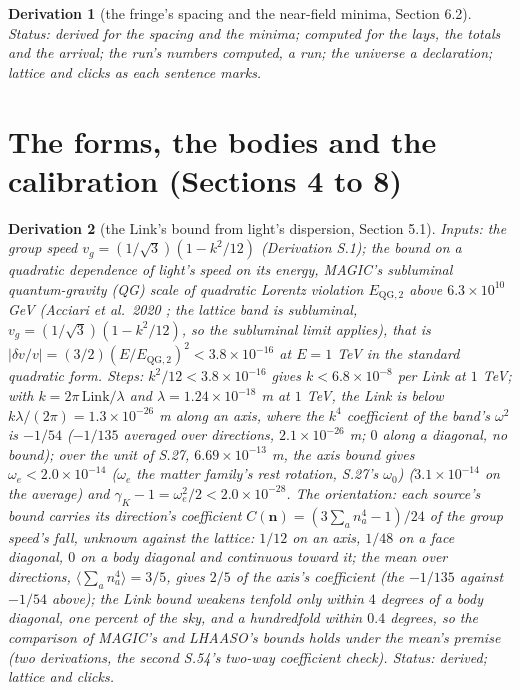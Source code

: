 \documentclass[pdflatex,sn-mathphys-num]{sn-jnl}
\theoremstyle{thmstyleone}
\newtheorem{derivation}{Derivation}
\begin{document}
\begin{derivation}[the fringe's spacing and the near-field minima, Section 6.2]
 \emph{Status:} derived for the spacing and the minima; computed for the lays, the totals and the arrival; the run's numbers computed, a run; the universe a declaration; lattice and clicks as each sentence marks.
\end{derivation}

\section*{The forms, the bodies and the calibration (Sections 4 to 8)}

\begin{derivation}[the Link's bound from light's dispersion, Section 5.1]
\emph{Inputs:} the group speed $v_g = (1 / \sqrt 3)(1 - k^2 / 12)$ (Derivation S.1); the bound on a quadratic dependence of light's speed on its energy, MAGIC's subluminal quantum-gravity (QG) scale of quadratic Lorentz violation $E_{\mathrm{QG}, 2}$ above $6.3 \times 10^{10}$ GeV (Acciari et al.\ 2020 \cite{magic}; the lattice band is subluminal, $v_g = (1 / \sqrt 3)(1 - k^2 / 12)$, so the subluminal limit applies), that is $|\delta v / v| = (3 / 2)(E / E_{\mathrm{QG}, 2})^2 < 3.8 \times 10^{-16}$ at $E = 1$ TeV in the standard quadratic form. \emph{Steps:} $k^2 / 12 < 3.8 \times 10^{-16}$ gives $k < 6.8 \times 10^{-8}$ per Link at $1$ TeV; with $k = 2\pi\,\mathrm{Link} / \lambda$ and $\lambda = 1.24 \times 10^{-18}$ m at $1$ TeV, the Link is below $k\lambda / (2\pi) = 1.3 \times 10^{-26}$ m along an axis, where the $k^4$ coefficient of the band's $\omega^2$ is $-1 / 54$ ($-1 / 135$ averaged over directions, $2.1 \times 10^{-26}$ m; $0$ along a diagonal, no bound); over the unit of S.27, $6.69 \times 10^{-13}$ m, the axis bound gives $\omega_e < 2.0 \times 10^{-14}$ ($\omega_e$ the matter family's rest rotation, S.27's $\omega_0$) ($3.1 \times 10^{-14}$ on the average) and $\gamma_K - 1 = \omega_e^2 / 2 < 2.0 \times 10^{-28}$. \emph{The orientation:} each source's bound carries its direction's coefficient $C(\mathbf n) = (3\sum_a n_a^4 - 1) / 24$ of the group speed's fall, unknown against the lattice: $1 / 12$ on an axis, $1 / 48$ on a face diagonal, $0$ on a body diagonal and continuous toward it; the mean over directions, $\langle\sum_a n_a^4\rangle = 3 / 5$, gives $2 / 5$ of the axis's coefficient (the $-1 / 135$ against $-1 / 54$ above); the Link bound weakens tenfold only within $4$ degrees of a body diagonal, one percent of the sky, and a hundredfold within $0.4$ degrees, so the comparison of MAGIC's and LHAASO's bounds holds under the mean's premise (two derivations, the second S.54's two-way coefficient check).
 \emph{Status:} derived; lattice and clicks.
\end{derivation}
\end{document}
